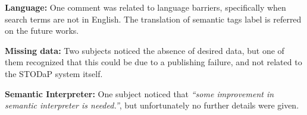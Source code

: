 \noindent \textbf{Language: } One comment was related to language barriers, specifically when search terms are not in English.
The translation of semantic tags label is referred on the future works.

\noindent \textbf{Missing data: } Two subjects noticed the absence of desired data, but one of them recognized that this could be due to a publishing failure, and not related to the STODaP system itself.

\noindent \textbf{Semantic Interpreter:} One subject noticed that \emph{``some improvement in semantic interpreter is needed.''}, but unfortunately no further details were given.



